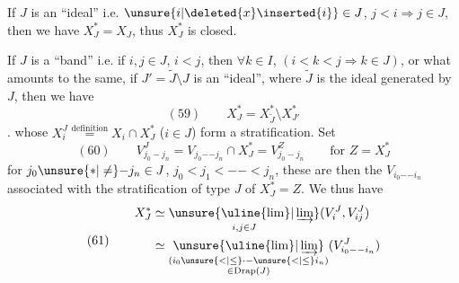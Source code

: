 If $J$ is an ``ideal'' i.e. $\unsure{i|\deleted{x}\inserted{i}}\in J$, $j<i\Longrightarrow j\in J$,
then we have $X_J^*=X_J$, thus $X_J^*$ is closed.

If $J$ is a ``band'' i.e. if $i,j\in J$, $i<j$,
then $\forall k\in I$, $(i<k<j\Longrightarrow k\in J)$,
or what amounts to the same, if $J'=\widetilde J\setminus J$ is
an ``ideal'', where $\widetilde J$ is the ideal generated by $J$,
then we have
\[
(59)\qquad X_J^*=X_{\widetilde J}^*\setminus X_{J'}^*
\]
.
whose $X_i^J\overset{\mathrm{definition}}{=}X_i\cap X_J^*$ ($i\in J$)
form a stratification. Set
\[
(60)\qquad V_{j_0-j_n}^J
=V_{j_0\mathord{-}\mathord{-}j_n}\cap X_J^*=V_{j_0-j_n}^Z
\qquad\text{for }Z=X_J^*
\]
for $j_0\unsure{\ast|\ne}\mathord{-}j_n\in J$, $j_0<j_1<\mathord{-}\mathord{-}<j_n$,
these are then the $V_{i_0\mathord{-}\mathord{-}i_n}$ associated with the stratification
of type $J$ of $X_J^*=Z$. We thus have
\[
(61)\qquad\begin{aligned}
X_J^*&\simeq\underset{i,j\in J}{\unsure{\uline{\lim}|\varinjlim}}
(V_i^J,V_{ij}^J)\\
&\simeq\underset{\substack{(i_0\unsure{<|\leq}\mathord{\cdot}\mathord{-}\unsure{<|\leq}i_n)\\\in\operatorname{Drap}(J)}}{\unsure{\uline{\lim}|\varinjlim}}
(V_{i_0\mathord{-}\mathord{-}i_n}^J)
\end{aligned}
\]
